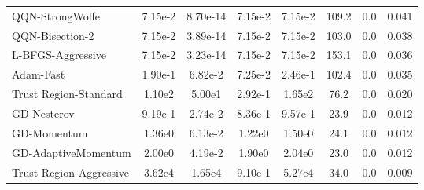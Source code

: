 \documentclass{article}
\begin{document}
\begin{table}[htbp]
{\begin{tabular}{p{2.5cm}*{7}{c}}
QQN-StrongWolfe & 7.15e-2 & 8.70e-14 & 7.15e-2 & 7.15e-2 & 109.2 & 0.0 & 0.041 \\
QQN-Bisection-2 & 7.15e-2 & 3.89e-14 & 7.15e-2 & 7.15e-2 & 103.0 & 0.0 & 0.038 \\
L-BFGS-Aggressive & 7.15e-2 & 3.23e-14 & 7.15e-2 & 7.15e-2 & 153.1 & 0.0 & 0.036 \\
Adam-Fast & 1.90e-1 & 6.82e-2 & 7.25e-2 & 2.46e-1 & 102.4 & 0.0 & 0.035 \\
Trust Region-Standard & 1.10e2 & 5.00e1 & 2.92e-1 & 1.65e2 & 76.2 & 0.0 & 0.020 \\
GD-Nesterov & 9.19e-1 & 2.74e-2 & 8.36e-1 & 9.57e-1 & 23.9 & 0.0 & 0.012 \\
GD-Momentum & 1.36e0 & 6.13e-2 & 1.22e0 & 1.50e0 & 24.1 & 0.0 & 0.012 \\
GD-AdaptiveMomentum & 2.00e0 & 4.19e-2 & 1.90e0 & 2.04e0 & 23.0 & 0.0 & 0.012 \\
Trust Region-Aggressive & 3.62e4 & 1.65e4 & 9.10e-1 & 5.27e4 & 34.0 & 0.0 & 0.009 \\
\bottomrule
\end{tabular}
}
\end{table}
\end{document}
